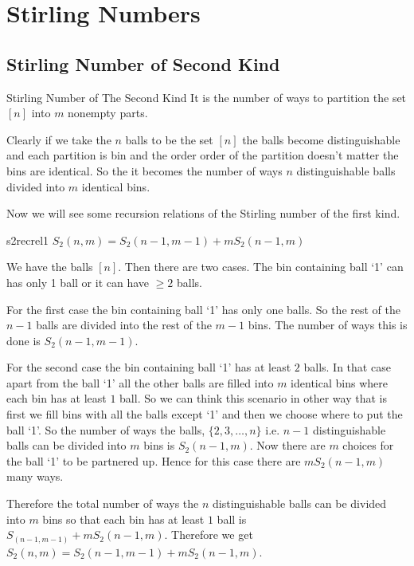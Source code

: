 \documentclass[twoside]{article}
\begin{document}
\section{Stirling Numbers}
\subsection{Stirling Number of Second Kind}
\begin{Definition}{Stirling Number of The Second Kind}{}
	It is the number of ways to partition the set $[n]$ into $m$ nonempty parts. 
\end{Definition}

Clearly if we take the $n$ balls to be the set $[n]$ the balls become distinguishable and each partition is bin and the order order of the partition doesn't matter the bins are identical. So the it becomes the number of ways $n$ distinguishable balls divided into $m$ identical bins.

Now we will see some recursion relations of the Stirling number of the first kind. 

\begin{lemma}{}{s2recrel1}
	$S_2(n,m)=S_2(n-1,m-1)+mS_2(n-1,m)$
\end{lemma}
\begin{combi-proof}
	We have the balls $[n]$. Then there are two cases. The bin containing ball `1' can has only 1 ball or it can have $\geq 2$ balls. 
	
	For the first case the bin containing ball `1' has only one balls. So the rest of the $n-1$ balls are divided into the rest of the $m-1$ bins. The number of ways this is done is $S_2(n-1,m-1)$.
	
	For the second case the bin containing ball `1' has at least $2$ balls. In that case apart from the ball `1' all the other balls are filled into $m$ identical bins where each bin has at least $1$ ball. So we can think this scenario in other way that is first we fill bins with all the balls except `1' and then we choose where to put the ball `1'. So the number of ways the balls, $\{2,3,\dots, n\}$ i.e. $n-1$ distinguishable balls can be divided into $m$ bins is $S_2(n-1,m)$. Now there are $m$ choices for the ball `1' to be partnered up. Hence for this case there are $mS_2(n-1,m)$ many ways.
	
	Therefore the total number of ways the $n$ distinguishable balls can be divided into $m$ bins so that each bin has at least $1$ ball is $S_(n-1,m-1)+mS_2(n-1,m)$. Therefore we get $S_2(n,m)=S_2(n-1,m-1)+mS_2(n-1,m)$.
\end{combi-proof}
\end{document}
